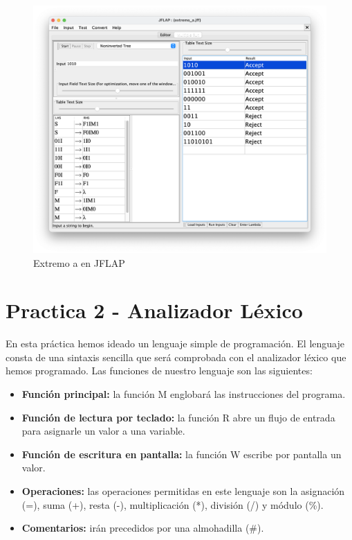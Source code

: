 \begin{figure}[H] 
	\centering
	\includegraphics[scale=0.35]{../practica_1/images/extremo_a.png} 
	\caption{Extremo a en JFLAP} 
    \label{fig:extremo_a}
\end{figure}

\newpage
\section{Practica 2 - Analizador Léxico}
En esta práctica hemos ideado un lenguaje simple de programación. El lenguaje consta de una sintaxis sencilla que será comprobada con el analizador léxico
que hemos programado. Las funciones de nuestro lenguaje son las siguientes:

\begin{itemize}
	\item \textbf{Función principal: } la función M englobará las instrucciones del programa.
	\item \textbf{Función de lectura por teclado: } la función R abre un flujo de entrada para asignarle un valor a una variable.
	\item \textbf{Función de escritura en pantalla: } la función W escribe por pantalla un valor.
	\item \textbf{Operaciones: } las operaciones permitidas en este lenguaje son la asignación (=), suma (+), resta (-), multiplicación (*), división (/) y módulo (\%).
	\item \textbf{Comentarios: } irán precedidos por una almohadilla (\#).
\end{itemize}

